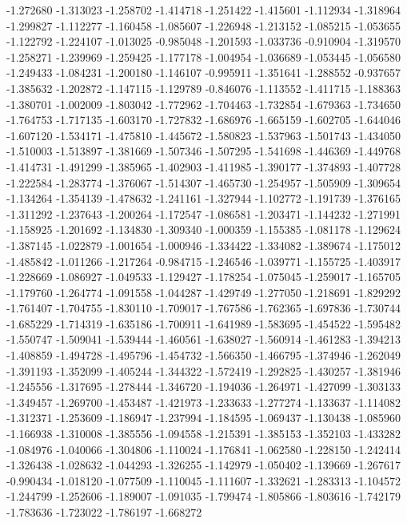 -1.272680
-1.313023
-1.258702
-1.414718
-1.251422
-1.415601
-1.112934
-1.318964
-1.299827
-1.112277
-1.160458
-1.085607
-1.226948
-1.213152
-1.085215
-1.053655
-1.122792
-1.224107
-1.013025
-0.985048
-1.201593
-1.033736
-0.910904
-1.319570
-1.258271
-1.239969
-1.259425
-1.177178
-1.004954
-1.036689
-1.053445
-1.056580
-1.249433
-1.084231
-1.200180
-1.146107
-0.995911
-1.351641
-1.288552
-0.937657
-1.385632
-1.202872
-1.147115
-1.129789
-0.846076
-1.113552
-1.411715
-1.188363
-1.380701
-1.002009
-1.803042
-1.772962
-1.704463
-1.732854
-1.679363
-1.734650
-1.764753
-1.717135
-1.603170
-1.727832
-1.686976
-1.665159
-1.602705
-1.644046
-1.607120
-1.534171
-1.475810
-1.445672
-1.580823
-1.537963
-1.501743
-1.434050
-1.510003
-1.513897
-1.381669
-1.507346
-1.507295
-1.541698
-1.446369
-1.449768
-1.414731
-1.491299
-1.385965
-1.402903
-1.411985
-1.390177
-1.374893
-1.407728
-1.222584
-1.283774
-1.376067
-1.514307
-1.465730
-1.254957
-1.505909
-1.309654
-1.134264
-1.354139
-1.478632
-1.241161
-1.327944
-1.102772
-1.191739
-1.376165
-1.311292
-1.237643
-1.200264
-1.172547
-1.086581
-1.203471
-1.144232
-1.271991
-1.158925
-1.201692
-1.134830
-1.309340
-1.000359
-1.155385
-1.081178
-1.129624
-1.387145
-1.022879
-1.001654
-1.000946
-1.334422
-1.334082
-1.389674
-1.175012
-1.485842
-1.011266
-1.217264
-0.984715
-1.246546
-1.039771
-1.155725
-1.403917
-1.228669
-1.086927
-1.049533
-1.129427
-1.178254
-1.075045
-1.259017
-1.165705
-1.179760
-1.264774
-1.091558
-1.044287
-1.429749
-1.277050
-1.218691
-1.829292
-1.761407
-1.704755
-1.830110
-1.709017
-1.767586
-1.762365
-1.697836
-1.730744
-1.685229
-1.714319
-1.635186
-1.700911
-1.641989
-1.583695
-1.454522
-1.595482
-1.550747
-1.509041
-1.539444
-1.460561
-1.638027
-1.560914
-1.461283
-1.394213
-1.408859
-1.494728
-1.495796
-1.454732
-1.566350
-1.466795
-1.374946
-1.262049
-1.391193
-1.352099
-1.405244
-1.344322
-1.572419
-1.292825
-1.430257
-1.381946
-1.245556
-1.317695
-1.278444
-1.346720
-1.194036
-1.264971
-1.427099
-1.303133
-1.349457
-1.269700
-1.453487
-1.421973
-1.233633
-1.277274
-1.133637
-1.114082
-1.312371
-1.253609
-1.186947
-1.237994
-1.184595
-1.069437
-1.130438
-1.085960
-1.166938
-1.310008
-1.385556
-1.094558
-1.215391
-1.385153
-1.352103
-1.433282
-1.084976
-1.040066
-1.304806
-1.110024
-1.176841
-1.062580
-1.228150
-1.242414
-1.326438
-1.028632
-1.044293
-1.326255
-1.142979
-1.050402
-1.139669
-1.267617
-0.990434
-1.018120
-1.077509
-1.110045
-1.111607
-1.332621
-1.283313
-1.104572
-1.244799
-1.252606
-1.189007
-1.091035
-1.799474
-1.805866
-1.803616
-1.742179
-1.783636
-1.723022
-1.786197
-1.668272
